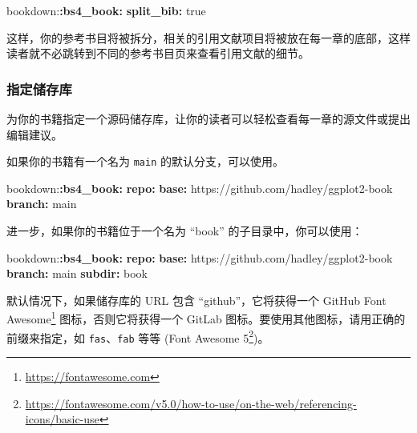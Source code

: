 \documentclass[
  12pt,
]{krantz}
\newenvironment{Shaded}{\begin{snugshade}}{\end{snugshade}}
\newcommand{\AttributeTok}[1]{\textcolor[rgb]{0.13,0.29,0.53}{#1}}
\newcommand{\CharTok}[1]{\textcolor[rgb]{0.31,0.60,0.02}{#1}}
\newcommand{\FunctionTok}[1]{\textcolor[rgb]{0.13,0.29,0.53}{\textbf{#1}}}
\newcommand{\KeywordTok}[1]{\textcolor[rgb]{0.13,0.29,0.53}{\textbf{#1}}}
\renewcommand{\href}[2]{#2\footnote{\url{#1}}}
\theoremstyle{definition}
\theoremstyle{definition}
\theoremstyle{definition}
\theoremstyle{definition}
\theoremstyle{remark}
\begin{document}
\begin{Shaded}
\begin{Highlighting}[]
\AttributeTok{bookdown:}\FunctionTok{:bs4\_book}\KeywordTok{:}
\AttributeTok{  }\FunctionTok{split\_bib}\KeywordTok{:}\AttributeTok{ }\CharTok{true}
\end{Highlighting}
\end{Shaded}

这样，你的参考书目将被拆分，相关的引用文献项目将被放在每一章的底部，这样读者就不必跳转到不同的参考书目页来查看引用文献的细节。

\subsubsection{指定储存库}\label{ux6307ux5b9aux50a8ux5b58ux5e93}

为你的书籍指定一个源码储存库，让你的读者可以轻松查看每一章的源文件或提出编辑建议。

如果你的书籍有一个名为 \texttt{main} 的默认分支，可以使用。

\begin{Shaded}
\begin{Highlighting}[]
\AttributeTok{bookdown:}\FunctionTok{:bs4\_book}\KeywordTok{:}
\AttributeTok{  }\FunctionTok{repo}\KeywordTok{:}
\AttributeTok{    }\FunctionTok{base}\KeywordTok{:}\AttributeTok{ https://github.com/hadley/ggplot2{-}book}
\AttributeTok{    }\FunctionTok{branch}\KeywordTok{:}\AttributeTok{ main}
\end{Highlighting}
\end{Shaded}

进一步，如果你的书籍位于一个名为 ``book'' 的子目录中，你可以使用：

\begin{Shaded}
\begin{Highlighting}[]
\AttributeTok{bookdown:}\FunctionTok{:bs4\_book}\KeywordTok{:}
\AttributeTok{  }\FunctionTok{repo}\KeywordTok{:}
\AttributeTok{    }\FunctionTok{base}\KeywordTok{:}\AttributeTok{ https://github.com/hadley/ggplot2{-}book}
\AttributeTok{    }\FunctionTok{branch}\KeywordTok{:}\AttributeTok{ main}
\AttributeTok{    }\FunctionTok{subdir}\KeywordTok{:}\AttributeTok{ book}
\end{Highlighting}
\end{Shaded}

默认情况下，如果储存库的 URL 包含 ``github''，它将获得一个 GitHub \href{https://fontawesome.com}{Font Awesome} 图标，否则它将获得一个 GitLab 图标。要使用其他图标，请用正确的前缀来指定，如 \texttt{fas}、\texttt{fab} 等等 (\href{https://fontawesome.com/v5.0/how-to-use/on-the-web/referencing-icons/basic-use}{Font Awesome 5})。
\end{document}
